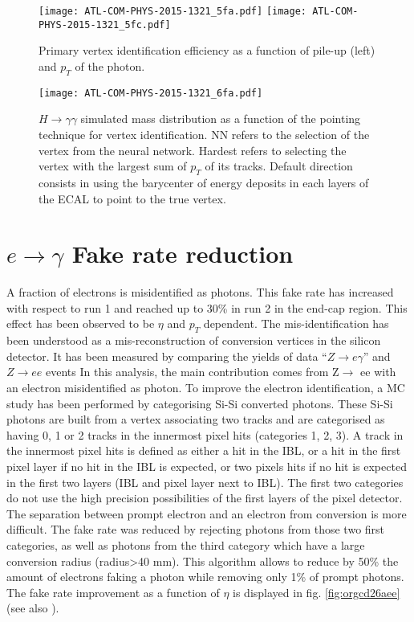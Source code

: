 \begin{figure}
  \centering
  \texttt{[image: ATL-COM-PHYS-2015-1321\_5fa.pdf]}
  \texttt{[image: ATL-COM-PHYS-2015-1321\_5fc.pdf]}
  \caption{Primary vertex identification efficiency as a function of pile-up (left) and $p_T$ of the photon.\cite{ATL-COM-PHYS-2015-1321}}
  \label{fig:Calibration_RecoID_NNPointingEff}
\end{figure}

\begin{figure}
  \centering
  \texttt{[image: ATL-COM-PHYS-2015-1321\_6fa.pdf]}
  \caption{$H\rightarrow\gamma\gamma$ simulated mass distribution as a function of the pointing technique for vertex identification.
    NN refers to the selection of the vertex from the neural network.
    Hardest refers to selecting the vertex with the largest sum of $p_T$ of its tracks.
    Default direction consists in using the barycenter of energy deposits in each layers of the ECAL to point to the true vertex.
    \cite{ATL-COM-PHYS-2015-1321}}
  \label{fig:Calibration_RecoID_NNPointingMass}
\end{figure}


\section{\(e\rightarrow\gamma\) Fake rate reduction}
\label{sec:org846d203}
A fraction of electrons is misidentified as photons.
This fake rate has increased with respect to run 1 and reached up to 30\% in run 2 in the end-cap region.
This effect has been observed to be $\eta$ and $p_T$ dependent.
The mis-identification has been understood as a mis-reconstruction of conversion vertices in the silicon detector.
It has been measured by comparing the yields of data ``$Z\rightarrow e\gamma$'' and \(Z\rightarrow ee\) events
In this analysis, the main contribution comes from Z\(\rightarrow\) ee with an electron misidentified as photon.
To improve the electron identification, a MC study has been performed by categorising Si-Si converted photons.
These Si-Si photons are built from a vertex associating two tracks and are categorised as having 0, 1 or 2 tracks in the innermost pixel hits (categories 1, 2, 3).
A track in the innermost pixel hits is defined as either a hit in the IBL, or a hit in the first pixel layer if no hit in the IBL is expected, or two pixels hits if no hit is expected in the first two layers (IBL and pixel layer next to IBL).
The first two categories do not use the high precision possibilities of the first layers of the pixel detector.
The separation between prompt electron and an electron from conversion is more difficult.
The fake rate was reduced by rejecting photons from those two first categories, as well as photons from the third category which have a large conversion radius (radius>40 mm).
This algorithm allows to reduce by 50\% the amount of electrons faking a photon while removing only 1\% of prompt photons.
The fake rate improvement as a function of $\eta$ is displayed in fig. \ref{fig:orgcd26aee} (see also \cite{ATL-COM-PHYS-2016-575} ).


